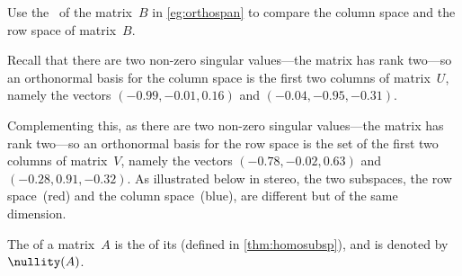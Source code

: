 \begin{example} \label{eg:}
Use the \svd\ of the matrix~\(B\) in \autoref{eg:orthospan} to compare the column space and the row space of matrix~\(B\).
\begin{solution} 
Recall that there are two non-zero singular values---the matrix has rank two---so an orthonormal basis for the column space is  the first two columns of matrix~\(U\), namely the vectors  \((-0.99,-0.01,0.16)\) and \((-0.04,-0.95,-0.31)\).

Complementing this, as there are two non-zero singular values---the matrix has rank two---so an orthonormal basis for the row space is the set of the first two columns of matrix~\(V\), namely the vectors  \((-0.78,-0.02, 0.63)\) and \((-0.28, 0.91,-0.32)\).
As illustrated below in stereo, the two subspaces, the row space~(red) and the column space~(blue), are different but of the same dimension.
\begin{center}
\end{center}
\end{solution}
\end{example}




\begin{definition} \label{def:nullity} 
The  of a matrix~\(A\) is the  of its  (defined in \autoref{thm:homosubsp}), and is denoted by \(\nullity(A)\).
\end{definition}

